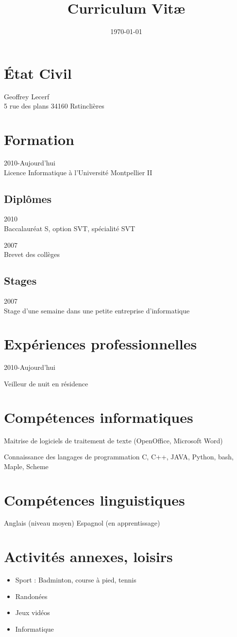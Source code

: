 \documentclass[a4paper]{article}
\title{Curriculum Vit\ae}
\date{\today}
\begin{document}
\maketitle

\section*{\'Etat Civil}
Geoffrey Lecerf\\5 rue des plans 34160 Rstinclières\\

\section*{Formation}
2010-Aujourd'hui\\
Licence Informatique à l'Université Montpellier II

\subsection*{Diplômes}
2010\\
Baccalauréat S, option SVT, spécialité SVT 

2007\\
Brevet des collèges

\subsection*{Stages}
2007\\
Stage d'une semaine dans une petite entreprise d'informatique

\section*{Expériences professionnelles}
2010-Aujourd'hui 

Veilleur de nuit en résidence 

\section*{Compétences informatiques}
Maitrise de logiciels de traitement de texte (OpenOffice, Microsoft Word)

Connaissance des langages de programmation C, C++, JAVA, Python, bash, Maple, Scheme

\section*{Compétences linguistiques}
Anglais (niveau moyen)
Espagnol (en apprentissage)

\section*{Activités annexes, loisirs}
\begin{itemize}
\item Sport : Badminton, course à pied, tennis
\item Randonées
\item Jeux vidéos
\item Informatique
\end{itemize}
\end{document}
